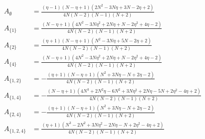 \documentclass[11pt]{article}
\begin{document}
\begin{align*}
  A_{\emptyset} &= \frac{\left(\eta - 1\right) \left(N - \eta + 1\right) \left(2 N^{2} - 3 N \eta + 3 N - 2 \eta + 2\right)}{4 N \left(N - 2\right) \left(N - 1\right) \left(N + 2\right)} \\
  A_{\{1\}} &= \frac{\left(N - \eta + 1\right) \left(4 N^{2} - 3 N \eta^{2} + 2 N \eta + N - 2 \eta^{2} + 4 \eta - 2\right)}{4 N \left(N - 2\right) \left(N - 1\right) \left(N + 2\right)} \\
  A_{\{2\}} &= \frac{\left(\eta + 1\right) \left(N - \eta + 1\right) \left(N^{2} - 3 N \eta + 5 N - 2 \eta + 2\right)}{4 N \left(N - 2\right) \left(N - 1\right) \left(N + 2\right)} \\
  A_{\{4\}} &= \frac{\left(N - \eta + 1\right) \left(4 N^{2} - 3 N \eta^{2} + 2 N \eta + N - 2 \eta^{2} + 4 \eta - 2\right)}{4 N \left(N - 2\right) \left(N - 1\right) \left(N + 2\right)} \\
  A_{\{1,2\}} &= - \frac{\left(\eta + 1\right) \left(N - \eta + 1\right) \left(N^{2} + 3 N \eta - N + 2 \eta - 2\right)}{4 N \left(N - 2\right) \left(N - 1\right) \left(N + 2\right)} \\
  A_{\{1,4\}} &= - \frac{\left(N - \eta + 1\right) \left(4 N^{3} + 2 N^{2} \eta - 6 N^{2} + 3 N \eta^{2} + 2 N \eta - 5 N + 2 \eta^{2} - 4 \eta + 2\right)}{4 N \left(N - 2\right) \left(N - 1\right) \left(N + 2\right)} \\
  A_{\{2,4\}} &= - \frac{\left(\eta + 1\right) \left(N - \eta + 1\right) \left(N^{2} + 3 N \eta - N + 2 \eta - 2\right)}{4 N \left(N - 2\right) \left(N - 1\right) \left(N + 2\right)} \\
  A_{\{1,2,4\}} &= \frac{\left(\eta + 1\right) \left(N^{3} - 2 N^{2} + 3 N \eta^{2} - 2 N \eta - N + 2 \eta^{2} - 4 \eta + 2\right)}{4 N \left(N - 2\right) \left(N - 1\right) \left(N + 2\right)} 
\end{align*}
\end{document}
